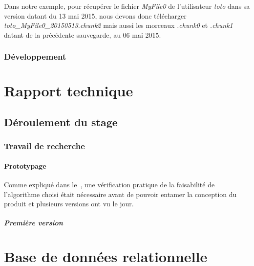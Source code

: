 \documentclass[a4paper,10pt, twoside]{report}
\begin{document}
\begin{spacing}{1.2}
Dans notre exemple, pour r\'ecup\'erer le fichier \textit{MyFile0} de
l'utilisateur \textit{toto}  dans sa version datant du 13 mai 2015, nous devons
donc t\'el\'echarger \textit{toto\_MyFile0\_20150513.chunk2} mais aussi les
morceaux \textit{.chunk0} et \textit{.chunk1} datant de la pr\'ec\'edente
sauvegarde, au 06 mai 2015.



\subsection{D\'eveloppement}


\chapter{Rapport technique}
\thispagestyle{fancy}
\label{rapportTechnique}
\section{D\'eroulement du stage}
\subsection{Travail de recherche}
\subsubsection{Prototypage}
Comme expliqu\'e dans le~, une v\'erification pratique
de la faisabilit\'e de l'algorithme choisi \'etait n\'ecessaire avant de
pouvoir entamer la conception du produit et plusieurs versions ont vu le jour.

\paragraph{Premi\`ere version}



\newpage
\listoffigures
\listoftables



\appendix
\makeatletter
\def\@seccntformat#1{Annexe~\csname the#1\endcsname:\quad}
\makeatother
\chapter{Base de donn\'ees relationnelle}
\label{annBDR}
\thispagestyle{fancy}

\end{spacing}
\end{document}
